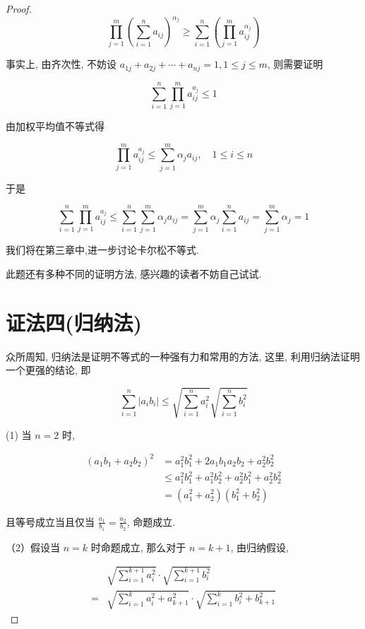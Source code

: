 \begin{proof}
	$$
	\prod_{j=1}^{m}\left(\sum_{i=1}^{n} a_{i j}\right)^{\alpha_{j}} \geqslant \sum_{i=1}^{n}\left(\prod_{j=1}^{m} a_{i j}^{\alpha_{j}}\right)
	$$
	
	事实上, 由齐次性, 不妨设 $a_{1 j}+a_{2 j}+\cdots+a_{n j}=1,1 \leqslant j \leqslant m$, 则需要证明
	
	$$
	\sum_{i=1}^{n} \prod_{j=1}^{m} a_{i j}^{a_{j}} \leqslant 1
	$$
	
	由加权平均值不等式得
	
	$$
	\prod_{j=1}^{m} a_{i j}^{a_{j}} \leqslant \sum_{j=1}^{m} \alpha_{j} a_{i j}, \quad 1 \leqslant i \leqslant n
	$$
	
	于是
	
	$$
	\sum_{i=1}^{n} \prod_{j=1}^{m} a_{i j}^{a_{j}} \leqslant \sum_{i=1}^{n} \sum_{j=1}^{m} \alpha_{j} a_{i j}=\sum_{j=1}^{m} \alpha_{j} \sum_{i=1}^{n} a_{i j}=\sum_{j=1}^{m} \alpha_{j}=1
	$$
	
	我们将在第三章中,进一步讨论卡尔松不等式.
\begin{note}
	此题还有多种不同的证明方法, 感兴趣的读者不妨自己试试.
\end{note}	

	\section*{证法四(归纳法)}
	众所周知, 归纳法是证明不等式的一种强有力和常用的方法, 这里, 利用归纳法证明一个更强的结论, 即
	
	$$
	\sum_{i=1}^{n}\left|a_{i} b_{i}\right| \leqslant \sqrt{\sum_{i=1}^{n} a_{i}^{2}} \sqrt{\sum_{i=1}^{n} b_{i}^{2}}
	$$
	
	(1) 当 $n=2$ 时,
	
	$$
	\begin{aligned}
	\left(a_{1} b_{1}+a_{2} b_{2}\right)^{2} & =a_{1}^{2} b_{1}^{2}+2 a_{1} b_{1} a_{2} b_{2}+a_{2}^{2} b_{2}^{2} \\
	& \leqslant a_{1}^{2} b_{1}^{2}+a_{1}^{2} b_{2}^{2}+a_{2}^{2} b_{1}^{2}+a_{2}^{2} b_{2}^{2} \\
	& =\left(a_{1}^{2}+a_{2}^{2}\right)\left(b_{1}^{2}+b_{2}^{2}\right)
	\end{aligned}
	$$
	
	且等号成立当且仅当 $\frac{a_{1}}{b_{1}}=\frac{a_{2}}{b_{2}}$, 命题成立.
	
	（2）假设当 $n=k$ 时命题成立, 那么对于 $n=k+1$, 由归纳假设,
	
	$$
	\begin{aligned}
	& \sqrt{\sum_{i=1}^{k+1} a_{i}^{2}} \cdot \sqrt{\sum_{i=1}^{k+1} b_{i}^{2}} \\
	= & \sqrt{\sum_{i=1}^{k} a_{i}^{2}+a_{k+1}^{2}} \cdot \sqrt{\sum_{i=1}^{k} b_{i}^{2}+b_{k+1}^{2}}
	\end{aligned}
	$$
	

\end{proof}

